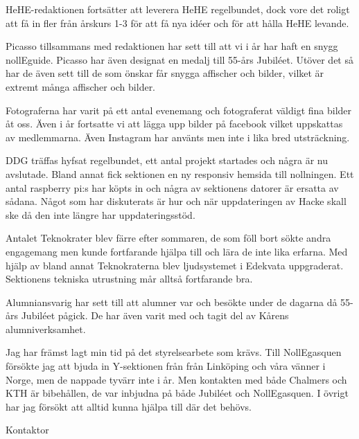\documentclass[../_main/handlingar.tex]{subfiles}
\begin{document}
HeHE-redaktionen fortsätter att leverera HeHE regelbundet, dock vore det roligt att få in fler från årskurs 1-3 för att få nya idéer och för att hålla HeHE levande.

Picasso tillsammans med redaktionen har sett till att vi i år har haft en snygg nollEguide. Picasso har även designat en medalj till 55-års Jubiléet. Utöver det så har de även sett till de som önskar får snygga affischer och bilder, vilket är extremt många affischer och bilder.

Fotograferna har varit på ett antal evenemang och fotograferat väldigt fina bilder åt oss. Även i år fortsatte vi att lägga upp bilder på facebook vilket uppskattas av medlemmarna. Även Instagram har använts men inte i lika bred utsträckning.

DDG träffas hyfsat regelbundet, ett antal projekt startades och några är nu avslutade. Bland annat fick sektionen en ny responsiv hemsida till nollningen. Ett antal raspberry pi:s har köpts in och några av sektionens datorer är ersatta av sådana. Något som har diskuterats är hur och när uppdateringen av Hacke skall ske då den inte längre har uppdateringsstöd.

Antalet Teknokrater blev färre efter sommaren, de som föll bort sökte andra engagemang men kunde fortfarande hjälpa till och lära de inte lika erfarna. Med hjälp av bland annat Teknokraterna blev ljudsystemet i Edekvata uppgraderat. Sektionens tekniska utrustning mår alltså fortfarande bra.

Alumniansvarig har sett till att alumner var och besökte under de dagarna då 55-års Jubiléet pågick. De har även varit med och tagit del av Kårens alumniverksamhet.

Jag har främst lagt min tid på det styrelsearbete som krävs. Till NollEgasquen försökte jag att bjuda in Y-sektionen från från Linköping och våra vänner i Norge, men de nappade tyvärr inte i år. Men kontakten med både Chalmers och KTH är bibehållen, de var inbjudna på både Jubiléet och NollEgasquen. I övrigt har jag försökt att alltid kunna hjälpa till där det behövs.
\begin{signatures}{1}
    \mvh
    \signature{\sekr}{Kontaktor}
\end{signatures}
\end{document}
